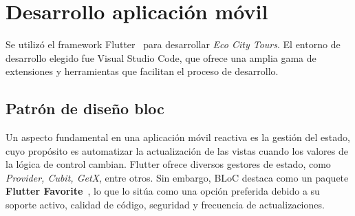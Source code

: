 \section{Desarrollo aplicación móvil}
Se utilizó el framework Flutter~\cite{flutter} para desarrollar \textit{Eco City Tours}. El entorno de desarrollo elegido fue Visual Studio Code, que ofrece una amplia gama de extensiones y herramientas que facilitan el proceso de desarrollo.
	
	\subsection{Patrón de diseño \acrfull{bloc}}
	Un aspecto fundamental en una aplicación móvil reactiva es la gestión del estado, cuyo propósito es automatizar la actualización de las vistas cuando los valores de la lógica de control cambian. Flutter ofrece diversos gestores de estado, como \textit{Provider, Cubit, GetX}, entre otros. Sin embargo, BLoC destaca como un paquete \textbf{Flutter Favorite}~\cite{bloc_package}, lo que lo sitúa como una opción preferida debido a su soporte activo, calidad de código, seguridad y frecuencia de actualizaciones.
	
